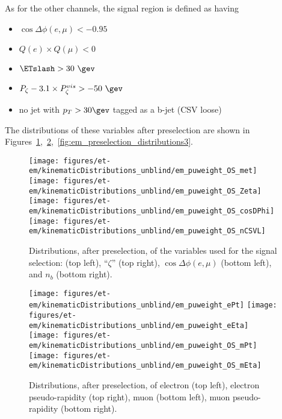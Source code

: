 As for the other channels, the signal region is defined as having
\begin{itemize}
  \item $\cos{\Delta \phi (e,\mu)}<-0.95$
  \item $Q(e) \times Q(\mu) < 0$
  \item $\ETslash>30~\gev$
  \item $P_{\zeta}- 3.1 \times P_{\zeta}^{vis} > -50~\gev$
  \item no jet with $p_T>30\gev$ tagged as a b-jet (CSV loose)
\end{itemize}

The distributions of these variables after preselection are shown in
Figures~\ref{fig:em_preselection_distributions1},~\ref{fig:em_preselection_distributions2},~\ref{fig:em_preselection_distributions3}.

\begin{figure}[b]\centering
  \texttt{[image: figures/et-em/kinematicDistributions\_unblind/em\_puweight\_OS\_met]}
  \texttt{[image: figures/et-em/kinematicDistributions\_unblind/em\_puweight\_OS\_Zeta]} \\
  \texttt{[image: figures/et-em/kinematicDistributions\_unblind/em\_puweight\_OS\_cosDPhi]}
  \texttt{[image: figures/et-em/kinematicDistributions\_unblind/em\_puweight\_OS\_nCSVL]}
  \caption{\label{fig:em_preselection_distributions1} Distributions,
    after preselection, of the variables used for the \tetm signal
    selection: \ETslash (top left), ``$\zeta$'' (top right),
    $\cos{\Delta \phi (e,\mu)}$ (bottom left), and $n_b$ (bottom
    right).}
\end{figure}

\begin{figure}\centering
  \texttt{[image: figures/et-em/kinematicDistributions\_unblind/em\_puweight\_ePt]}
  \texttt{[image: figures/et-em/kinematicDistributions\_unblind/em\_puweight\_eEta]} \\
  \texttt{[image: figures/et-em/kinematicDistributions\_unblind/em\_puweight\_OS\_mPt]}
  \texttt{[image: figures/et-em/kinematicDistributions\_unblind/em\_puweight\_OS\_mEta]}
  \caption{\label{fig:em_preselection_distributions2} Distributions,
    after \tetm preselection, of electron \pt (top left), electron
    pseudo-rapidity (top right), muon \pt (bottom left), muon
    pseudo-rapidity (bottom right).}
\end{figure}

